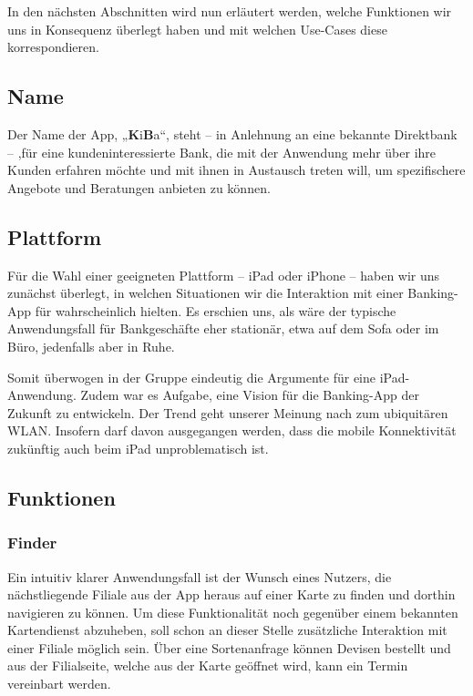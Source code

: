 	In den nächsten Abschnitten wird nun erläutert werden, welche Funktionen wir uns in Konsequenz überlegt haben und mit welchen Use-Cases diese korrespondieren.
\newpage
\subsection{Name}
    Der Name der App, „\textbf{K}i\textbf{B}a“, steht – in Anlehnung an eine bekannte Direktbank – ,für eine kundeninteressierte Bank, die mit der Anwendung mehr über ihre Kunden erfahren möchte und mit ihnen in Austausch treten will, um spezifischere Angebote und Beratungen anbieten zu können.
    
\subsection{Plattform}
    Für die Wahl einer geeigneten Plattform – iPad oder iPhone – haben wir uns zunächst überlegt, in welchen Situationen wir die Interaktion mit einer Banking-App für wahrscheinlich hielten. Es erschien uns, als wäre der typische Anwendungsfall für Bankgeschäfte eher stationär, etwa auf dem Sofa oder im Büro, jedenfalls aber in Ruhe.     
    
    Somit überwogen in der Gruppe eindeutig die Argumente für eine iPad-Anwendung. Zudem war es Aufgabe, eine Vision für die Banking-App der Zukunft zu entwickeln. Der Trend geht unserer Meinung nach zum ubiquitären WLAN. Insofern darf davon ausgegangen werden, dass die mobile Konnektivität zukünftig auch beim iPad unproblematisch ist.
    
\subsection{Funktionen}
\subsubsection{Finder}
	Ein intuitiv klarer Anwendungsfall ist der Wunsch eines Nutzers, die nächstliegende Filiale aus der App heraus auf einer Karte zu finden und dorthin navigieren zu können. Um diese Funktionalität noch gegenüber einem bekannten Kartendienst abzuheben, soll schon an dieser Stelle zusätzliche Interaktion mit einer Filiale möglich sein. Über eine Sortenanfrage können Devisen bestellt und aus der Filialseite, welche aus der Karte geöffnet wird, kann ein Termin vereinbart werden.

